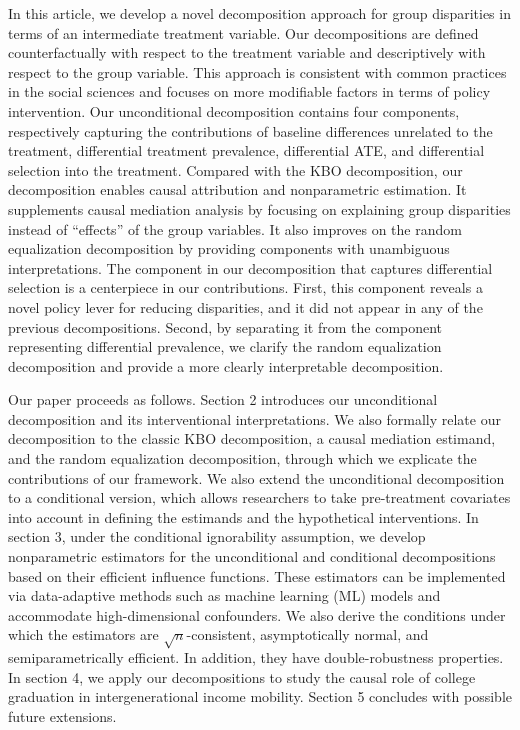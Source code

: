 \documentclass[12pt,a4paper]{article}
\begin{document}
In this article, we develop a novel decomposition approach for group disparities in terms of an intermediate treatment variable. Our decompositions are defined counterfactually with respect to the treatment variable and descriptively with respect to the group variable. This approach is consistent with common practices in the social sciences and focuses on more modifiable factors in terms of policy intervention. Our unconditional decomposition contains four components, respectively capturing the contributions of baseline differences unrelated to the treatment, differential treatment prevalence, differential ATE, and differential selection into the treatment. Compared with the KBO decomposition, our decomposition enables causal attribution and nonparametric estimation. It supplements causal mediation analysis by focusing on explaining group disparities instead of ``effects'' of the group variables. It also improves on the random equalization decomposition by providing components with unambiguous interpretations. The component in our decomposition that captures differential selection is a centerpiece in our contributions. First, this component reveals a novel policy lever for reducing disparities, and it did not appear in any of the previous decompositions. Second, by separating it from the component representing differential prevalence, we clarify the random equalization decomposition and provide a more clearly interpretable decomposition. 

Our paper proceeds as follows. Section 2 introduces our unconditional decomposition and its interventional interpretations. We also formally relate our decomposition to the classic KBO decomposition, a causal mediation estimand, and the random equalization decomposition, through which we explicate the contributions of our framework. We also extend the unconditional decomposition to a conditional version, which allows researchers to take pre-treatment covariates into account in defining the estimands and the hypothetical interventions. In section 3, under the conditional ignorability assumption, we develop nonparametric estimators for the unconditional and conditional decompositions based on their efficient influence functions. These estimators can be implemented via data-adaptive methods such as machine learning (ML) models and accommodate high-dimensional confounders. We also derive the conditions under which the estimators are $\sqrt{n}$-consistent, asymptotically normal, and semiparametrically efficient. In addition, they have double-robustness properties. In section 4, we apply our decompositions to study the causal role of college graduation in intergenerational income mobility. Section 5 concludes with possible future extensions. 
\end{document}
